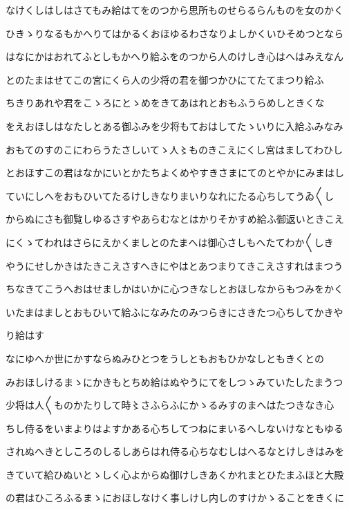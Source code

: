 \documentclass[a4paper,11pt,landscape]{ltjtarticle}
\begin{document}
なけくしはしはさてもみ給はてをのつから思所ものせらるらんものを女のかく
\par\medskip
ひきゝりなるもかへりてはかるくおほゆるわさなりよしかくいひそめつとなら
\par\medskip
はなにかはおれてふとしもかへり給ふをのつから人のけしき心はへはみえなん
\par\medskip
とのたまはせてこの宮にくら人の少将の君を御つかひにてたてまつり給ふ
\par\medskip
ちきりあれや君をこゝろにとゝめをきてあはれとおもふうらめしときくな
\par\medskip
をえおほしはなたしとある御ふみを少将もておはしてたゝいりに入給ふみなみ
\par\medskip
おもてのすのこにわらうたさしいてゝ人〻ものきこえにくし宮はましてわひし
\par\medskip
とおほすこの君はなかにいとかたちよくめやすきさまにてのとやかにみまはし
\par\medskip
ていにしへをおもひいてたるけしきなりまいりなれにたる心ちしてうゐ〱し
\par\medskip
からぬにさも御覧しゆるさすやあらむなとはかりそかすめ給ふ御返いときこえ
\par\medskip
にくゝてわれはさらにえかくましとのたまへは御心さしもへたてわか〱しき
\par\medskip
やうにせしかきはたきこえさすへきにやはとあつまりてきこえさすれはまつう
\par\medskip
ちなきてこうへおはせましかはいかに心つきなしとおほしなからもつみをかく
\par\medskip
いたまはましとおもひいて給ふになみたのみつらきにさきたつ心ちしてかきや
\par\medskip
り給はす
\par\medskip
なにゆへか世にかすならぬみひとつをうしともおもひかなしともきくとの
\par\medskip
みおほしけるまゝにかきもとちめ給はぬやうにてをしつゝみていたしたまうつ
\par\medskip
少将は人〱ものかたりして時〻さふらふにかゝるみすのまへはたつきなき心
\par\medskip
ちし侍るをいまよりはよすかある心ちしてつねにまいるへしないけなともゆる
\par\medskip
されぬへきとしころのしるしあらはれ侍る心ちなむしはへるなとけしきはみを
\par\medskip
きていて給ひぬいとゝしく心よからぬ御けしきあくかれまとひたまふほと大殿
\par\medskip
の君はひころふるまゝにおほしなけく事しけし内しのすけかゝることをきくに
\par\medskip
\end{document}
